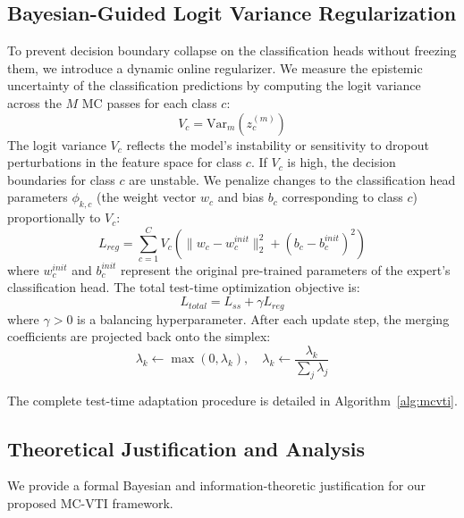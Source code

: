 \documentclass{article}
\theoremstyle{plain}
\theoremstyle{definition}
\theoremstyle{remark}
\begin{document}
\subsection{Bayesian-Guided Logit Variance Regularization}
To prevent decision boundary collapse on the classification heads without freezing them, we introduce a dynamic online regularizer. We measure the epistemic uncertainty of the classification predictions by computing the logit variance across the $M$ MC passes for each class $c$:
\begin{equation}
  V_c = \text{Var}_m(z_c^{(m)})
\end{equation}
The logit variance $V_c$ reflects the model's instability or sensitivity to dropout perturbations in the feature space for class $c$. If $V_c$ is high, the decision boundaries for class $c$ are unstable. We penalize changes to the classification head parameters $\phi_{k,c}$ (the weight vector $w_c$ and bias $b_c$ corresponding to class $c$) proportionally to $V_c$:
\begin{equation}
  L_{reg} = \sum_{c=1}^C V_c \left( \| w_c - w_c^{init} \|_2^2 + (b_c - b_c^{init})^2 \right)
\end{equation}
where $w_c^{init}$ and $b_c^{init}$ represent the original pre-trained parameters of the expert's classification head. The total test-time optimization objective is:
\begin{equation}
  L_{total} = L_{ss} + \gamma L_{reg}
\end{equation}
where $\gamma > 0$ is a balancing hyperparameter. After each update step, the merging coefficients are projected back onto the simplex:
\begin{equation}
  \lambda_k \leftarrow \max(0, \lambda_k), \quad \lambda_k \leftarrow \frac{\lambda_k}{\sum_j \lambda_j}
\end{equation}

The complete test-time adaptation procedure is detailed in Algorithm~\ref{alg:mcvti}.



\subsection{Theoretical Justification and Analysis}
\label{subsec:theory}
We provide a formal Bayesian and information-theoretic justification for our proposed MC-VTI framework.
\end{document}
